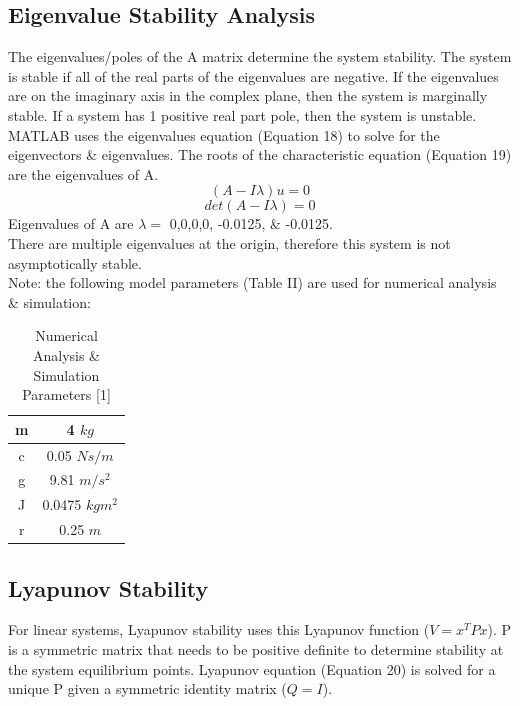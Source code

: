 \documentclass[conference]{IEEEtran}
\begin{document}
\subsection{Eigenvalue Stability Analysis}
The eigenvalues/poles of the A matrix determine the system stability. The system is stable if all of the real parts of the eigenvalues are negative. If the eigenvalues are on the imaginary axis in the complex plane, then the system is marginally stable. If a system has 1 positive real part pole, then the system is unstable. \\

 MATLAB uses the eigenvalues equation (Equation 18) to solve for the eigenvectors \& eigenvalues. The roots of the characteristic equation (Equation 19) are the eigenvalues of A.
 \[
(A - I\lambda)u = 0 \tag{18}
\]
\[
det(A - I\lambda) = 0 \tag{19}
\]
Eigenvalues of A are $\lambda =$ 0,0,0,0, -0.0125, \& -0.0125.\\
There are multiple eigenvalues at the origin, therefore this system is not asymptotically stable. \\

Note: the following model parameters (Table II) are used for numerical analysis \& simulation:\\
\begin{table}[h]

\begin{center}
\caption{Numerical Analysis \& Simulation Parameters [1]}
\label{thelabel}
\begin{tabular}{ |c|c| } 
\hline
m	& 4	$kg$\\
\hline
c	&0.05 $Ns/m$\\
\hline
g	 &9.81 $m/s^2$\\
\hline
J	&0.0475	$kgm^2$\\
\hline
r&	0.25 $m$\\
\hline
\end{tabular}
\end{center}
\end{table}

\subsection{Lyapunov Stability}
For linear systems, Lyapunov stability uses this Lyapunov function ($V = x^TPx$). P is a symmetric matrix that needs to be positive definite to determine stability at the system equilibrium points. Lyapunov equation (Equation 20) is solved for a unique P given a symmetric identity matrix ($Q = I$). 
\end{document}
